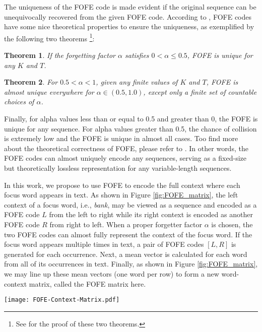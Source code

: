 \documentclass[11pt,letterpaper]{article}
\newtheorem{theorem}{Theorem}
\begin{document}
The uniqueness of the FOFE code is made evident if the original sequence can be unequivocally recovered from the given FOFE code. According to \cite{zhang}, FOFE codes have some nice theoretical properties to ensure the uniqueness, as exemplified by the following two theorems \footnote{See \cite{zhang_arxiv} for the proof of these two theorems.}:

\begin{theorem}
\label{theorem-FOFE-alpha-less-half}
If the forgetting factor $\alpha$ satisfies $0<\alpha \leq 0.5$, {\em FOFE} is unique for any $K$ and $T$.	
\end{theorem}

\begin{theorem}
\label{theorem-FOFE-alpha-less-one}
For $0.5 < \alpha <1$, given any finite values of $K$ and $T$,  {\em FOFE} is almost unique everywhere for  $\alpha \in (0.5, 1.0)$, except only a finite set of countable choices of $\alpha$. 	
\end{theorem}

Finally, for alpha values less than or equal to 0.5 and greater than 0, the FOFE is unique for any sequence. For alpha values greater than 0.5, the chance of collision is extremely low and the FOFE is unique in almost all cases. Too find more about the theoretical correctness of FOFE, please refer to \cite{zhang}. In other words, the FOFE codes can almost uniquely encode any sequences, serving as a fixed-size but theoretically lossless representation for any variable-length sequences. 

In this work, we propose to use FOFE to encode the full context where each focus word appears in text. As shown in Figure \ref{fig:FOFE_matrix}, the left context of a focus word, i.e.,  {\em bank}, may be viewed as a sequence and encoded as a  FOFE code $L$ from the left to right while its right context is encoded as another FOFE code $R$ from right to left. When a proper forgetter factor $\alpha$ is chosen, the two FOFE codes can almost fully represent the context of the focus word. If the focus word appears multiple times in text, a pair of FOFE codes $[L, R]$ is generated for each occurrence. Next, a mean vector is calculated for each word from all of its occurrences in text. Finally, as shown in  Figure \ref{fig:FOFE_matrix}, we may line up these mean vectors (one word per row) to form a new word-context matrix, called the FOFE matrix here.

\begin{figure*}[t]
	\centering
	\texttt{[image: FOFE-Context-Matrix.pdf]} %
	\caption{i) encoding left and right contexts of each focus word with FOFE and ii) forming the FOFE word-context matrix.}
	\label{fig:FOFE_matrix}
\end{figure*}
\end{document}
